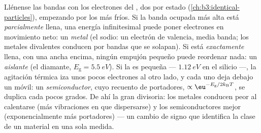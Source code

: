 \begin{definition}\label{def:b3:electrons-in-solids:classes}
Llénense las bandas con los electrones del , dos por estado
(\cref{ch:b3:identical-particles}), empezando por los más fríos. Si la banda ocupada
más alta está \emph{parcialmente} llena, una energía infinitesimal puede
poner electrones en movimiento neto: un \emph{metal} (el sodio: un
electrón de valencia, media banda; los metales divalentes conducen por
bandas que se solapan). Si está \emph{exactamente} llena, con una  ancha
encima, ningún empujón pequeño puede reordenar nada: un \emph{aislante}
(el diamante, $E_{\text{g}} = \qty{5.5}{eV}$). Si la  es pequeña ---
$\qty{1.12}{eV}$ en el silicio ---, la agitación térmica iza unos pocos
electrones al otro lado, y cada uno deja debajo un \emph{} móvil: un
\emph{semiconductor}, cuyo recuento de portadores,
$\propto\eu^{-E_{\text{g}}/2k_{\text{B}}T}$, se duplica cada pocos
grados. De ahí la gran divisoria: los metales conducen peor al calentarse
(más vibraciones en que dispersarse) y los semiconductores mejor
(exponencialmente más portadores) --- un cambio de signo que identifica la
clase de un material en una sola medida.
\end{definition}

